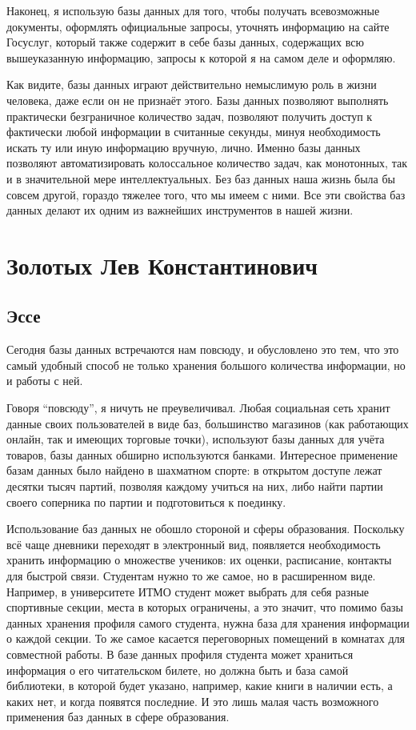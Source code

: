 \documentclass[14pt]{extreport}
\begin{document}
Наконец, я использую базы данных для того, чтобы получать всевозможные документы, оформлять официальные запросы, уточнять информацию на сайте Госуслуг, который также содержит в себе базы данных, содержащих всю вышеуказанную информацию, запросы к которой я на самом деле и оформляю.

Как видите, базы данных играют действительно немыслимую роль в жизни человека, даже если он не признаёт этого. Базы данных позволяют выполнять практически безграничное количество задач, позволяют получить доступ к фактически любой информации в считанные секунды, минуя необходимость искать ту или иную информацию вручную, лично. Именно базы данных позволяют автоматизировать колоссальное количество задач, как монотонных, так и в значительной мере интеллектуальных. Без баз данных наша жизнь была бы совсем другой, гораздо тяжелее того, что мы имеем с ними. Все эти свойства баз данных делают их одним из важнейших инструментов в нашей жизни.

\section{Золотых Лев Константинович}

\subsection{Эссе}

Сегодня базы данных встречаются нам повсюду, и обусловлено это тем, что это самый удобный способ не только хранения большого количества информации, но и работы с ней.

Говоря “повсюду”, я ничуть не преувеличивал. Любая социальная сеть хранит данные своих пользователей в виде баз, большинство магазинов (как работающих онлайн, так и имеющих торговые точки), используют базы данных для учёта товаров, базы данных обширно используются банками. Интересное применение базам данных было найдено в шахматном спорте: в открытом доступе лежат десятки тысяч партий, позволяя каждому учиться на них, либо найти партии своего соперника по партии и подготовиться к поединку.

Использование баз данных не обошло стороной и сферы образования. Поскольку всё чаще дневники переходят в электронный вид, появляется необходимость хранить информацию о множестве учеников: их оценки, расписание, контакты для быстрой связи. Студентам нужно то же самое, но в расширенном виде. Например, в университете ИТМО студент может выбрать для себя разные спортивные секции, места в которых ограничены, а это значит, что помимо базы данных хранения профиля самого студента, нужна база для хранения информации о каждой секции. То же самое касается переговорных помещений в комнатах для совместной работы. В базе данных профиля студента может храниться информация о его читательском билете, но должна быть и база самой библиотеки, в которой будет указано, например, какие книги в наличии есть, а каких нет, и когда появятся последние. И это лишь малая часть возможного применения баз данных в сфере образования.
\end{document}
